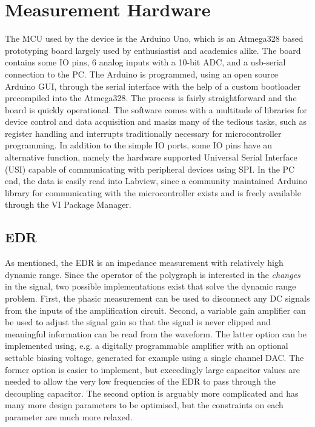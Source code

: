 \documentclass[a4paper,11pt]{article}
\begin{document}
\section{Measurement Hardware}
The MCU used by the device is the Arduino Uno, which is an Atmega328
based prototyping board largely used by enthusiastist and academics
alike. The board contains some IO pins, 6 analog inputs with a 10-bit
ADC, and a usb-serial connection to the PC. The Arduino is programmed,
using an open source Arduino GUI, through the serial interface with
the help of a custom bootloader precompiled into the Atmega328. The
process is fairly straightforward and the board is quickly
operational. The software comes with a multitude of libraries for
device control and data acquisition and masks many of the tedious
tasks, such as register handling and interrupts traditionally
necessary for microcontroller programming. In addition to the simple
IO ports, some IO pins have an alternative function, namely the
hardware supported Universal Serial Interface (USI) capable of
communicating with peripheral devices using SPI. In the PC end, the
data is easily read into Labview, since a community maintained Arduino
library for communicating with the microcontroller exists and is
freely available through the VI Package Manager.
\subsection*{EDR}
As mentioned, the EDR is an impedance measurement with relatively high
dynamic range. Since the operator of the polygraph is interested in
the \emph{changes} in the signal, two possible implementations exist
that solve the dynamic range problem. First, the phasic measurement
can be used to disconnect any DC signals from the inputs of the
amplification circuit. Second, a variable gain amplifier can be used
to adjust the signal gain so that the signal is never clipped and
meaningful information can be read from the waveform. The latter
option can be implemented using, e.g. a digitally programmable
amplifier with an optional settable biasing voltage, generated for
example using a single channel DAC. The former option is easier to
implement, but exceedingly large capacitor values are needed to allow
the very low frequencies of the EDR to pass through the decoupling
capacitor. The second option is arguably more complicated and has many
more design parameters to be optimised, but the constraints on each
parameter are much more relaxed. 
\end{document}

